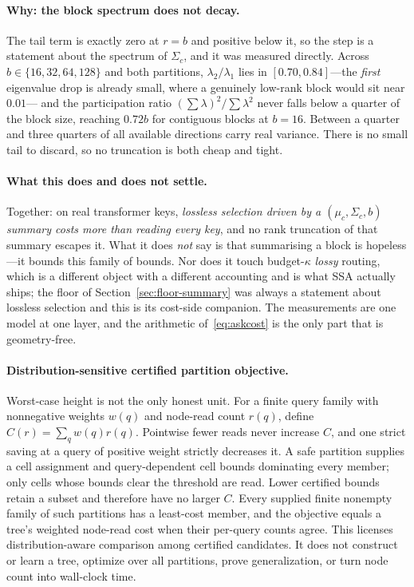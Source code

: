 \documentclass[11pt]{article}
\numberwithin{equation}{section}
\begin{document}
\paragraph{Why: the block spectrum does not decay.} The tail term is exactly zero at $r=b$ and positive
below it, so the step is a statement about the spectrum of $\Sigma_c$, and it was measured directly.
Across $b\in\{16,32,64,128\}$ and both partitions, $\lambda_2/\lambda_1$ lies in $[0.70,0.84]$---the
\emph{first} eigenvalue drop is already small, where a genuinely low-rank block would sit near $0.01$---
and the participation ratio $(\sum\lambda)^2/\sum\lambda^2$ never falls below a quarter of the block
size, reaching $0.72b$ for contiguous blocks at $b=16$. Between a quarter and three quarters of all
available directions carry real variance. There is no small tail to discard, so no truncation is both
cheap and tight.

\paragraph{What this does and does not settle.} Together: on real transformer keys, \emph{lossless
selection driven by a $(\mu_c,\Sigma_c,b)$ summary costs more than reading every key}, and no rank
truncation of that summary escapes it. What it does \emph{not} say is that summarising a block is
hopeless---it bounds this family of bounds. Nor does it touch budget-$\kappa$ \emph{lossy} routing,
which is a different object with a different accounting and is what SSA actually ships; the floor of
Section~\ref{sec:floor-summary} was always a statement about lossless selection and this is its cost-side
companion. The measurements are one model at one layer, and the arithmetic of~\eqref{eq:askcost} is the
only part that is geometry-free.

\paragraph{Distribution-sensitive certified partition objective.} Worst-case height is not the only honest
unit. For a finite query family with nonnegative weights $w(q)$ and node-read count $r(q)$, define
$C(r)=\sum_q w(q)r(q)$. Pointwise fewer reads never increase $C$, and one strict saving at a query of
positive weight strictly decreases it. A safe partition supplies a cell assignment and query-dependent cell
bounds dominating every member; only cells whose bounds clear the threshold are read. Lower certified
bounds retain a subset and therefore have no larger $C$. Every supplied finite nonempty family of such
partitions has a least-cost member, and the objective equals a tree's weighted node-read cost when their
per-query counts agree. This licenses distribution-aware comparison among certified candidates. It does not
construct or learn a tree, optimize over all partitions, prove generalization, or turn node count into
wall-clock time.
\end{document}
